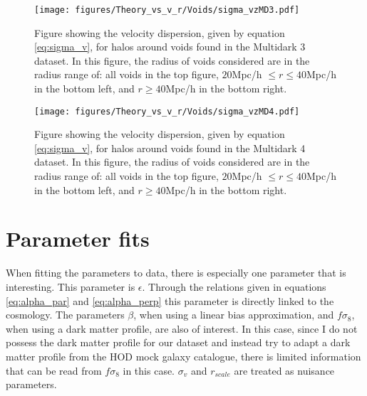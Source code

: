 \begin{figure}[H]
    \texttt{[image: figures/Theory\_vs\_v\_r/Voids/sigma\_vzMD3.pdf]}
    \caption{Figure showing the velocity dispersion,  given by equation \ref{eq:sigma_v}, for halos around voids found in the Multidark 3 dataset. In this figure, the radius of voids considered are in the radius range of: all voids in the top figure, $20$Mpc/h $\leq r\leq 40$Mpc/h in the bottom left, and $r\geq 40$Mpc/h in the bottom right.}
    \label{fig:sigmavMD3}
\end{figure}

\begin{figure}[H]
    \texttt{[image: figures/Theory\_vs\_v\_r/Voids/sigma\_vzMD4.pdf]}
    \caption{Figure showing the velocity dispersion, given by equation \ref{eq:sigma_v}, for halos around voids found in the Multidark 4 dataset. In this figure, the radius of voids considered are in the radius range of: all voids in the top figure, $20$Mpc/h $\leq r\leq 40$Mpc/h in the bottom left, and $r\geq 40$Mpc/h in the bottom right.}
    \label{fig:sigmavMD4}
\end{figure}
\section{Parameter fits}
When fitting the parameters to data, there is especially one parameter that is interesting. This parameter is $\epsilon$. Through the relations given in 
equations \ref{eq:alpha_par} and \ref{eq:alpha_perp} this parameter is directly linked to the cosmology. The parameters $\beta$, when using a linear bias approximation, and $f\sigma_8$,
when using a dark matter profile, are also of interest. In this case, since I do not possess the dark matter profile for our dataset and instead try to adapt a dark matter profile from the HOD mock galaxy catalogue, there is limited information that can be read from $f\sigma_8$ in this case. $\sigma_v$ and $r_{scale}$ are treated as nuisance parameters.

